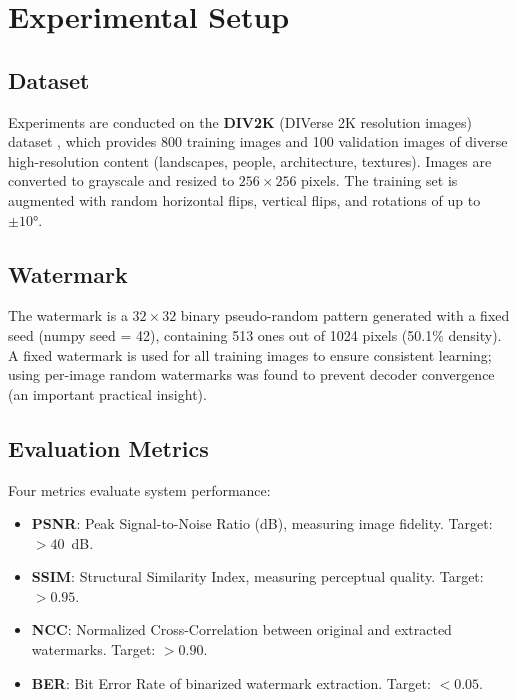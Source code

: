 \documentclass[journal]{IEEEtran}
\begin{document}
\section{Experimental Setup}

\subsection{Dataset}

Experiments are conducted on the \textbf{DIV2K} (DIVerse 2K resolution
images) dataset \cite{timofte2017ntire}, which provides 800 training
images and 100 validation images of diverse high-resolution content
(landscapes, people, architecture, textures). Images are converted to
grayscale and resized to $256 \times 256$ pixels. The training set is
augmented with random horizontal flips, vertical flips, and rotations
of up to $\pm 10°$.

\subsection{Watermark}

The watermark is a $32 \times 32$ binary pseudo-random pattern generated
with a fixed seed (numpy seed = 42), containing 513 ones out of 1024
pixels (50.1\% density). A fixed watermark is used for all training
images to ensure consistent learning; using per-image random watermarks
was found to prevent decoder convergence (an important practical insight).

\subsection{Evaluation Metrics}

Four metrics evaluate system performance:
\begin{itemize}
  \item \textbf{PSNR}: Peak Signal-to-Noise Ratio (dB), measuring
  image fidelity. Target: $>40$~dB.
  \item \textbf{SSIM}: Structural Similarity Index, measuring perceptual
  quality. Target: $>0.95$.
  \item \textbf{NCC}: Normalized Cross-Correlation between original and
  extracted watermarks. Target: $>0.90$.
  \item \textbf{BER}: Bit Error Rate of binarized watermark extraction.
  Target: $<0.05$.
\end{itemize}
\end{document}
